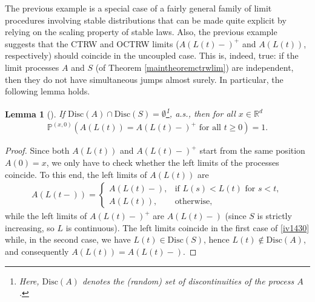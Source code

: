 \documentclass[reqno]{amsart}
\newtheorem{lemma}[theorem]{Lemma}
\theoremstyle{remark}
\numberwithin{equation}{section} %
\newcommand{\RR}{\mathbb{R}}
\newcommand{\1}{\mathds{1}}
\begin{document}
	The previous example is a special case of a fairly general family of limit procedures involving stable distributions that can be made quite explicit by relying on the scaling property of stable laws. Also, the previous example suggests that the CTRW and OCTRW limits ($A(L(t)-)^+$ and $A(L(t))$, respectively) should coincide in the uncoupled case. This is, indeed, true: if the limit processes $A$ and $S$ (of Theorem \ref{maintheoremctrwlim}) are independent, then they do not have simultaneous jumps almost surely. In particular, the following lemma holds.
	\begin{lemma}[{\cite[Lemma 3.9]{straka2011lagging}}]
		\label{lemma_ctrw=octrw}
		If $\textrm{Disc}(A) \cap \textrm{Disc} (S) = \emptyset$\footnote{Here, $\textrm{Disc}(A)$ denotes the (random) set of discontinuities of the process $A$.}, a.s., then for all $x\in\RR^{d}$
		\begin{align}
			\mathds{P}^{(x,0)} (A(L(t))=A(L(t)-)^+ \text{ for all } t \geq 0) = 1.
		\end{align}
	\end{lemma}
	\begin{proof}
		Since both $A(L(t))$ and $A(L(t)-)^+$ start from the same position $A(0)=x$, we only have to check whether the left limits of the processes coincide. To this end, the left limits of $A(L(t))$ are
		\begin{align}\label{iv1430}
			A(L(t-))=\begin{cases}
				A(L(t)-),&\text{if $L(s)<L(t)$ for $s<t$},\\
				A(L(t)),&\text{otherwise},
			\end{cases}
		\end{align}
		while the left limits of $A(L(t)-)^+$ are
		$A(L(t)-)$ (since $S$ is strictly increasing, so $L$ is continuous). The left limits coincide in the first case of \eqref{iv1430} while, in the second case, we have $L(t)\in \text{Disc}(S)$, hence $L(t)\notin \text{Disc}(A)$, and consequently $A(L(t))=A(L(t)-)$.
	\end{proof}
	
\end{document}
